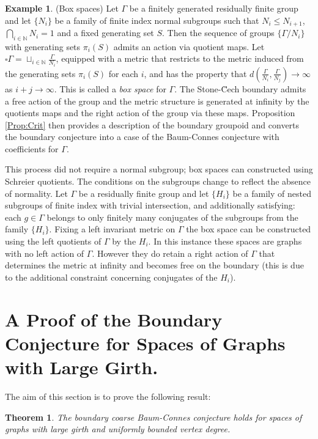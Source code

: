 \documentclass[11pt]{amsart}
\theoremstyle{plain}
\newtheorem*{thm}{Theorem}
\theoremstyle{definition}%
\newtheorem{example}[theorem]{Example}%
\theoremstyle{remark}%
\begin{document}
\begin{example}(Box spaces)
Let $\Gamma$ be a finitely generated residually finite group and let $\lbrace N_{i}\rbrace$ be a family of finite index normal subgroups such that $N_{i}\leq N_{i+1}$, $\bigcap_{i \in \mathbb{N}}N_{i}=1$ and a fixed generating set $S$. Then the sequence of groups $\lbrace \Gamma/N_{i}\rbrace$ with generating sets $\pi_{i}(S)$ admits an action via quotient maps. Let $\square\Gamma= \sqcup_{i \in \mathbb{N}}\frac{\Gamma}{N_{i}}$, equipped with a metric that restricts to the metric induced from the generating sets $\pi_{i}(S)$ for each $i$, and has the property that $d(\frac{\Gamma}{N_{i}},\frac{\Gamma}{N_{j}})\rightarrow \infty$ as $i+j \rightarrow \infty$. This is called a \textit{box space} for $\Gamma$. The Stone-\u{C}ech boundary admits a free action of the group and the metric structure is generated at infinity by the quotients maps and the right action of the group via these maps. Proposition \ref{Prop:Crit} then provides a description of the boundary groupoid and converts the boundary conjecture into a case of the Baum-Connes conjecture with coefficients for $\Gamma$.

This process did not require a normal subgroup; box spaces can constructed using Schreier quotients. The conditions on the subgroups change to reflect the absence of normality. Let $\Gamma$ be a residually finite group and let $\lbrace H_{i} \rbrace$ be a family of nested subgroups of finite index with trivial intersection, and additionally satisfying: each $g \in \Gamma$ belongs to only finitely many conjugates of the subgroups from the family $\lbrace H_{i} \rbrace$. Fixing a left invariant metric on $\Gamma$ the box space can be constructed using the left quotients of $\Gamma$ by the $H_{i}$. In this instance these spaces are graphs with no left action of $\Gamma$. However they do retain a right action of $\Gamma$ that determines the metric at infinity and becomes free on the boundary (this is due to the additional constraint concerning conjugates of the $H_{i}$).
\end{example}

\section{A Proof of the Boundary Conjecture for Spaces of Graphs with Large Girth.}\label{Sect:MR}
The aim of this section is to prove the following result:
\begin{thm}
The boundary coarse Baum-Connes conjecture holds for spaces of graphs with large girth and uniformly bounded vertex degree.
\end{thm}
\end{document}
